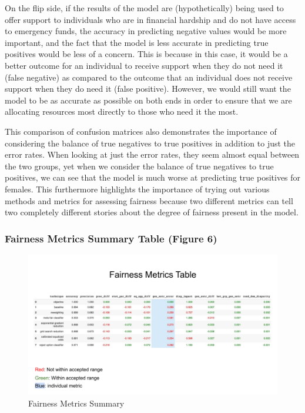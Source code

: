 \documentclass[water,article,submit,moreauthors,pdftex]{mdpi}
\begin{document}
On the flip side, if the results of the model are (hypothetically) being
used to offer support to individuals who are in financial hardship and
do not have access to emergency funds, the accuracy in predicting
negative values would be more important, and the fact that the model is
less accurate in predicting true positives would be less of a concern.
This is because in this case, it would be a better outcome for an
individual to receive support when they do not need it (false negative)
as compared to the outcome that an individual does not receive support
when they do need it (false positive). However, we would still want the
model to be as accurate as possible on both ends in order to ensure that
we are allocating resources most directly to those who need it the most.

This comparison of confusion matrices also demonstrates the importance
of considering the balance of true negatives to true positives in
addition to just the error rates. When looking at just the error rates,
they seem almost equal between the two groups, yet when we consider the
balance of true negatives to true positives, we can see that the model
is much worse at predicting true positives for females. This furthermore
highlights the importance of trying out various methods and metrics for
assessing fairness because two different metrics can tell two completely
different stories about the degree of fairness present in the model.

\hypertarget{fairness-metrics-summary-table-figure-6}{%
\subsubsection{Fairness Metrics Summary Table (Figure
6)}\label{fairness-metrics-summary-table-figure-6}}

\begin{figure}
\centering
\includegraphics[width=\textwidth,height=0.4\textheight]{images/FairnessMetricsSummary.png}
\caption{Fairness Metrics Summary}
\end{figure}
\end{document}
